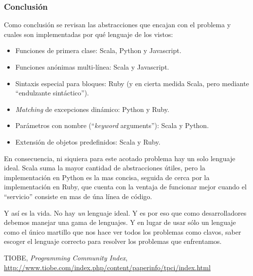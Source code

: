 \subsubsection*{Conclusión}

Como conclusión se revisan las abstracciones que encajan con el problema y
cuales son implementadas por qué lenguaje de los vistos:

\begin{itemize}
\item Funciones de primera clase: Scala, Python y Javascript.
\item Funciones anónimas multi-línea: Scala y Javascript.
\item Sintaxis especial para bloques: Ruby (y en cierta medida Scala, pero
  mediante ``endulzante sintáctico'').
\item \emph{Matching} de excepciones dinámico: Python y Ruby.
\item Parámetros con nombre (``\emph{keyword} arguments''): Scala y Python.
\item Extensión de objetos predefinidos: Scala y Ruby.
\end{itemize}

En consecuencia, ni siquiera para este acotado problema hay un solo lenguaje
ideal. Scala suma la mayor cantidad de abstracciones útiles, pero la
implementación en Python es la mas concisa, seguida de cerca por la
implementación en Ruby, que cuenta con la ventaja de funcionar mejor cuando el
``servicio'' consiste en mas de úna línea de código.

Y así es la vida. No hay \emph{un} lenguaje ideal. Y es por eso que como
desarrolladores debemos manejar una gama de lenguajes. Y en lugar de usar sólo
un lenguaje como el único martillo que nos hace ver todos los problemas como
clavos, saber escoger el lenguaje correcto para resolver los problemas que
enfrentamos.

\begin{thebibliography}{}

  TIOBE, \textit{Programming Community Index},
   \url{http://www.tiobe.com/index.php/content/paperinfo/tpci/index.html}
   
\end{thebibliography}

\newpage

